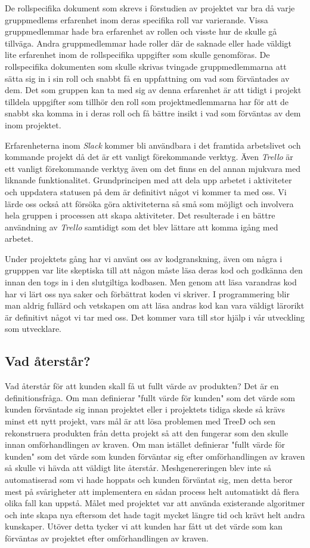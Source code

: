 De rollspecifika dokument som skrevs i förstudien av projektet var bra då varje gruppmedlems erfarenhet inom deras specifika roll var varierande. Vissa gruppmedlemmar hade bra erfarenhet av rollen och visste hur de skulle gå tillväga. Andra gruppmedlemmar hade roller där de saknade eller hade väldigt lite erfarenhet inom de rollspecifika uppgifter som skulle genomföras. De rollspecifika dokumenten som skulle skrivas tvingade gruppmedlemmarna att sätta sig in i sin roll och snabbt få en uppfattning om vad som förväntades av dem. Det som gruppen kan ta med sig av denna erfarenhet är att tidigt i projekt tilldela uppgifter som tillhör den roll som projektmedlemmarna har för att de snabbt ska komma in i deras roll och få bättre insikt i vad som förväntas av dem inom projektet.

Erfarenheterna inom \textit{Slack} kommer bli användbara i det framtida arbetslivet och kommande projekt då det är ett vanligt förekommande verktyg. Även \textit{Trello} är ett vanligt förekommande verktyg även om det finns en del annan mjukvara med liknande funktionalitet. Grundprincipen med att dela upp arbetet i aktiviteter och uppdatera statusen på dem är definitivt något vi kommer ta med oss. Vi lärde oss också att försöka göra aktiviteterna så små som möjligt och involvera hela gruppen i processen att skapa aktiviteter. Det resulterade i en bättre användning av \textit{Trello} samtidigt som det blev lättare att komma igång med arbetet.

Under projektets gång har vi använt oss av kodgranskning, även om några i grupppen var lite skeptiska till att någon måste läsa deras kod och godkänna den innan den togs in i den slutgiltiga kodbasen. Men genom att läsa varandras kod har vi lärt oss nya saker och förbättrat koden vi skriver. I programmering blir man aldrig fullärd och vetskapen om att läsa andras kod kan vara väldigt lärorikt är definitivt något vi tar med oss. Det kommer vara till stor hjälp i vår utveckling som utvecklare.


\subsection{Vad återstår?}
Vad återstår för att kunden skall få ut fullt värde av produkten? Det är en definitionsfråga. Om man definierar "fullt värde för kunden" som det värde som kunden förväntade sig innan projektet eller i projektets tidiga skede så krävs minst ett nytt projekt, vars mål är att lösa problemen med TreeD och sen rekonstruera produkten från detta projekt så att den fungerar som den skulle innan omförhandlingen av kraven. Om man istället definierar "fullt värde för kunden" som det värde som kunden förväntar sig efter omförhandlingen av kraven så skulle vi hävda att väldigt lite återstår. Meshgenereringen blev inte så automatiserad som vi hade hoppats och kunden förväntat sig, men detta beror mest på svårigheter att implementera en sådan process helt automatiskt då flera olika fall kan uppstå. Målet med projektet var att använda existerande algoritmer och inte skapa nya eftersom det hade tagit mycket längre tid och krävt helt andra kunskaper. Utöver detta tycker vi att kunden har fått ut det värde som kan förväntas av projektet efter omförhandlingen av kraven.


